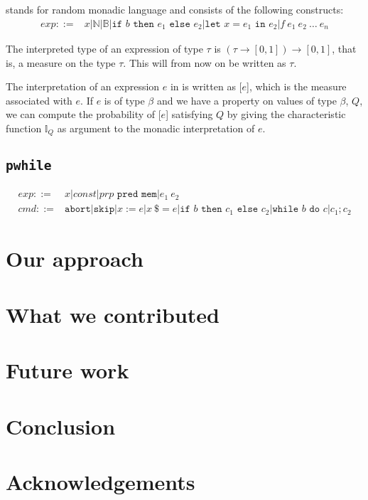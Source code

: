 \documentclass[titlepage]{article}
\begin{document}
\subsection{\rml}
\rml stands for random monadic language and consists of the following constructs:
\begin{align*}
  exp ::= & x \vert \mathbb{N} \vert \mathbb{B} \vert \texttt{if } b \texttt{ then }
  e_1 \texttt{ else } e_2 \vert \texttt{let } x = e_1 \texttt{ in } e_2 \vert
  f\ e_1\ e_2\ \dots\ e_n
\end{align*}

The interpreted type of an \rml expression of type $\tau$ is $(\tau \to [0,1]) \to [0,1]$,
that is, a measure on the type $\tau$. This will from now on be written as \M $\tau$.

The interpretation of an expression $e$ in \rml is written as [$e$], which is the
measure associated with $e$. If $e$ is of type \M $\beta$ and we have a property on
values of type $\beta$, $Q$, we can compute the probability of [$e$]
satisfying $Q$ by giving the characteristic function
$\mathbb{I}_Q$ as argument to the monadic interpretation of $e$. 


\subsection{\texttt{pwhile}}

\begin{align*}
  exp ::= & x \vert const \vert prp \texttt{ pred mem} \vert e_1\ e_2\\
  cmd ::= & \texttt{abort} \vert \texttt{skip} \vert x := e \vert x\ \$= e \vert
            \texttt{if } b \texttt{ then } c_1 \texttt{ else } c_2 \vert
            \texttt{while } b \texttt{ do } c \vert c_1 ; c_2
\end{align*}


\section{Our approach}\label{sec:approach}


\section{What we contributed}\label{sec:contrib}


\section{Future work}\label{sec:future}


\section{Conclusion}\label{sec:conclusion}


\section{Acknowledgements}
\end{document}
